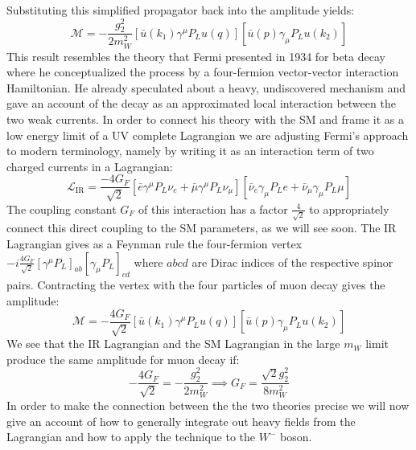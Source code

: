 Substituting this simplified propagator back into the amplitude yields:
\begin{equation}
    \mathcal{M}=-\frac{g_2^2}{2m_W^2}[\bar u(k_1)\gamma^\mu P_L u(q)][\bar u(p)\gamma_\mu P_L u(k_2)]
\end{equation}
This result resembles the theory that Fermi presented in 1934 for beta decay \cite{fermi1934tentativo} where he conceptualized the process by a four-fermion vector-vector interaction Hamiltonian. He already speculated about a heavy, undiscovered mechanism and gave an account of the decay as an approximated local interaction between the two weak currents. In order to connect his theory with the SM and frame it as a low energy limit of a UV complete Lagrangian we are adjusting Fermi's approach to modern terminology, namely by writing it as an interaction term of two charged currents in a Lagrangian:
\begin{equation}
    \mathcal{L}_\text{IR} = \frac{-4G_F}{\sqrt{2}} \left[ \bar{e} \gamma^\mu P_L \nu_e + \bar{\mu} \gamma^\mu P_L \nu_\mu \right] \left[ \bar{\nu}_e \gamma_\mu P_L e + \bar{\nu}_\mu \gamma_\mu P_L \mu \right]
    \label{eq:LagIR}
\end{equation}
The coupling constant $G_F$ of this interaction has a factor $\tfrac{4}{\sqrt{2}}$ to appropriately connect this direct coupling to the SM parameters, as we will see soon. The IR Lagrangian gives as a Feynman rule the four-fermion vertex $-i \frac{4G_F}{\sqrt{2}} [\gamma^\mu P_L]_{ab} [\gamma_\mu P_L]_{cd}$ where $abcd$ are Dirac indices of the respective spinor pairs. Contracting the vertex with the four particles of muon decay gives the amplitude:
\begin{equation}
    \mathcal{M}=-\frac{4G_F}{\sqrt{2}}[\bar u(k_1)\gamma^\mu P_L u(q)][\bar u(p)\gamma_\mu P_L u(k_2)]
    \label{eq:Amp4F}
\end{equation}
We see that the IR Lagrangian and the SM Lagrangian in the large $m_W$ limit produce the same amplitude for muon decay if:
\begin{equation}
    -\frac{4G_F}{\sqrt{2}}=-\frac{g_2^2}{2m_W^2}\implies G_F=\frac{\sqrt{2}g_2^2}{8m_W^2}
\end{equation}
In order to make the connection between the the two theories precise we will now give an account of how to generally integrate out heavy fields from the Lagrangian and how to apply the technique to the $W^-$ boson.

